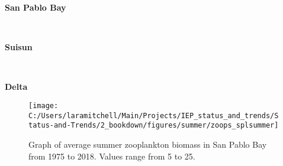 \documentclass[
]{book}
\begin{document}
\begin{panel-grid}

\begin{columns-nocenter}

\begin{column800}

\textbf{San Pablo Bay}

\end{column800}

\begin{column40}

~

\end{column40}

\begin{column800}

\textbf{Suisun}

\end{column800}

\begin{column40}

~

\end{column40}

\begin{column800}

\textbf{Delta}

\end{column800}

\end{columns-nocenter}

\begin{columns-nocenter}

\begin{column800}

\begin{expand}

\begin{figure}
\texttt{[image: C:/Users/laramitchell/Main/Projects/IEP\_status\_and\_trends/Status-and-Trends/2\_bookdown/figures/summer/zoops\_splsummer]} \caption{Graph of average summer zooplankton biomass in San Pablo Bay from 1975 to 2018. Values range from 5 to 25.}\label{fig:unnamed-chunk-70}
\end{figure}

\end{expand}

\end{column800}

\begin{column40}

~


\end{column40}
\end{columns-nocenter}
\end{panel-grid}
\end{document}
